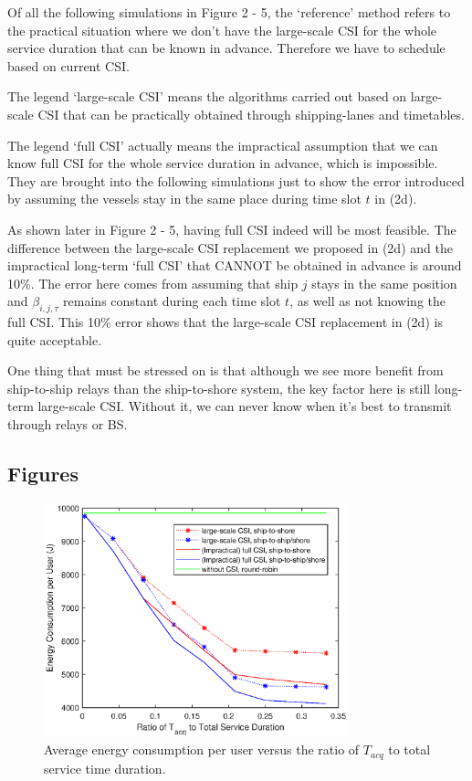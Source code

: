 \documentclass[conference]{IEEEtran}
\begin{document}
Of all the following simulations in Figure 2 - 5, the `reference' method refers to the practical situation where we don't have the large-scale CSI for the whole service duration that can be known in advance. Therefore we have to schedule based on current CSI. 

The legend `large-scale CSI' means the algorithms carried out based on large-scale CSI that can be practically obtained through shipping-lanes and timetables. 

The legend `full CSI' actually means the impractical assumption that we can know full CSI for the whole service duration in advance, which is impossible. They are brought into the following simulations just to show the error introduced by assuming the vessels stay in the same place during time slot $t$ in (2d). 


As shown later in Figure 2 - 5, having full CSI indeed will be most feasible. The difference between the large-scale CSI replacement we proposed in (2d) and the impractical long-term `full CSI' that CANNOT be obtained in advance is around 10\%. The error here comes from assuming that ship $j$ stays in the same position and $\beta _{i,j,\tau }$ remains constant during each time slot $t$, as well as not knowing the full CSI. This 10\% error shows that the large-scale CSI replacement in (2d) is quite acceptable. %

One thing that must be stressed on is that although we see more benefit from ship-to-ship relays than the ship-to-shore system, the key factor here is still long-term large-scale CSI. Without it, we can never know when it's best to transmit through relays or BS. 

\subsection{Figures}

\begin{figure} [htb]
\begin{center}
\includegraphics*[width=8.8cm]{Tranges.eps}
\end{center}
\vspace*{-4mm} 
\caption{Average energy consumption per user versus the ratio of ${T_{acq}}$ to total service time duration.} \label{fig:2}
\vspace*{-2mm} 
\end{figure}
\end{document}
